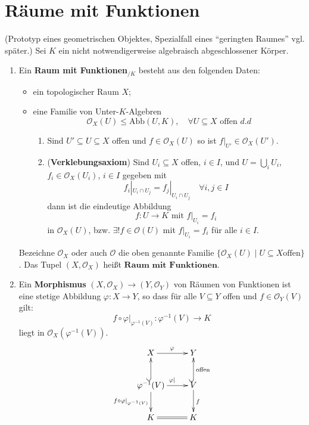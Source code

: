 
\section{Räume mit Funktionen}
\label{sec:raeume-mit-funktionen}
(Prototyp eines geometrischen Objektes, Spezialfall eines ``geringten
Raumes'' vgl. später.) Sei $K$ ein nicht notwendigerweise algebraisch abgeschlossener
Körper.
\begin{defn}
  \label{def:raum-mit-funktionen}
  \mbox{}
  \begin{enumerate}
  \item Ein \textbf{Raum mit Funktionen}$_{/K}$ besteht
    aus den folgenden Daten:
    \begin{itemize}
    \item ein topologischer Raum $X$;
    \item eine Familie von Unter-$K$-Algebren
      \[
        \mathcal{O}_X(U)\leq\text{Abb}(U,K),\quad\forall U\subseteq X\text{ offen }d.d
      \]

      \begin{enumerate}
      \item Sind $U'\subseteq U\subseteq X$ offen und $f\in\mathcal{O}_X(U)$ so ist
        $f|_{U'}\in \mathcal{O}_X(U')$.
      \item (\textbf{Verklebungsaxiom}) Sind $U_{i}\subseteq X$
        offen, $i\in I$, und $U=\bigcup_{i}U_{i}$, $f_{i}\in\mathcal{O}_X(U_{i})$,
        $i\in I$ gegeben mit
        \[
          f_{i}|_{U_{i}\cap U_{j}}=f_{j}|_{U_{i}\cap U_{j}}\quad\forall i,j\in I
        \]
        dann ist die eindeutige Abbildung
        \[
          f:U\rightarrow K\text{ mit }f|_{U_{i}}=f_{i}
        \]
        in $\mathcal{O}_X(U)$, bzw. $\exists!f\in\mathcal{O}(U)$ mit $f|_{U_{i}}=f_{i}$ für alle $i \in I$.
      \end{enumerate}
    \end{itemize}
    Bezeichne $\mathcal{O}_X$ oder auch $\mathcal{O}$ die oben genannte
    Familie $\{\mathcal{O}_X(U) \mid U \subseteq X \text{offen}\}$. Das Tupel $(X,\mathcal{O}_{X})$ heißt $\textbf{Raum mit Funktionen}$.
  \item Ein \textbf{Morphismus} $(X,\mathcal{O}_{X})\rightarrow(Y,\mathcal{O}_{Y})$
    von Räumen von Funktionen ist eine stetige Abbildung $\varphi:X\rightarrow Y$,
    so dass für alle $V\subseteq Y$ offen und $f\in\mathcal{O}_{Y}(V)$
    gilt:
    \[
      f\circ \varphi|_{\varphi^{-1}(V)}:\varphi^{-1}(V)\rightarrow K
    \]
    liegt in $\mathcal{O}_{X}(\varphi^{-1}(V))$.
    \[
      \xymatrix{X\ar[r]^{\varphi} & Y\\
        \varphi^{-1}(V)\ar[r]^{\varphi|}\ar[d]_{f\circ \varphi|_{\varphi^{-1}(V)}}\ar@{^{(}->}[u] & V\ar[d]^{f}\ar@{^{(}->}[u]_{\text{offen}}\\
        K\ar@{=}[r] & K
      }
    \]
  \end{enumerate}
\end{defn}

